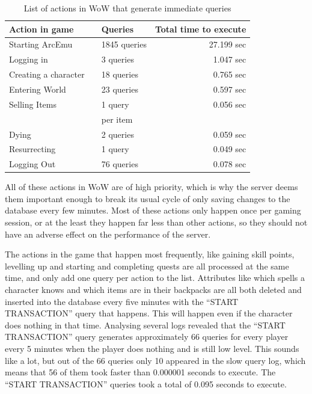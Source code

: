 \begin{table}[htbp]
  \centering
  \caption{List of actions in WoW that generate immediate queries}
    \begin{tabular}{lrlr}
    \addlinespace
    \toprule
    \textbf{Action in game} & \textbf{} & \textbf{Queries} & \textbf{Total time to execute} \\
    \midrule
    Starting ArcEmu &       & 1845 queries & 27.199 sec \\
    \midrule
    Logging in &       & 3 queries & 1.047 sec \\
    \midrule
    Creating a character &       & 18 queries & 0.765 sec \\
    \midrule
    Entering World &       & 23 queries & 0.597 sec \\
    \midrule
    Selling Items &       & 1  query & 0.056 sec \\
          &       & per item &  \\
    \midrule
    Dying &       & 2 queries & 0.059 sec \\
    \midrule
    Resurrecting &       & 1  query & 0.049 sec \\
    \midrule
    Logging Out &       & 76 queries & 0.078 sec \\
    \bottomrule
    \end{tabular}%
  \label{queries}%
\end{table}%


All of these actions in WoW are of high priority, which is why the server deems them important enough to break its usual cycle of only saving changes to the database every few minutes. Most of these actions only happen once per gaming session, or at the least they happen far less than other actions, so they should not have an adverse effect on the performance of the server.

The actions in the game that happen most frequently, like gaining skill points, levelling up and starting and completing quests are all processed at the same time, and only add one query per action to the list. Attributes like which spells a character knows and which items are in their backpacks are all both deleted and inserted into the database every five minutes with the ``START TRANSACTION'' query that happens. This will happen even if the character does nothing in that time. Analysing several logs revealed that the ``START TRANSACTION'' query generates approximately 66 queries for every player every 5 minutes when the player does nothing and is still low level. This sounds like a lot, but out of the 66 queries only 10 appeared in the slow query log, which means that 56 of them took faster than 0.000001 seconds to execute. 
The ``START TRANSACTION'' queries took a total of  0.095 seconds to execute.

